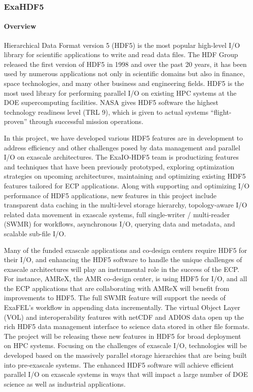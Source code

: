 \subsubsection{ ExaHDF5}
\label{subsubsect:exahdf5}

\paragraph{Overview} 

Hierarchical Data Format version 5 (HDF5) is the most popular high-level I/O library for scientific applications to write and read data files. The HDF Group released the first version of HDF5 in 1998 and over the past 20 years, it has been used by numerous applications not only in scientific domains but also in finance, space technologies, and many other business and engineering fields. HDF5 is the most used library for performing parallel I/O on existing HPC systems at the DOE supercomputing facilities. NASA gives HDF5 software the highest technology readiness level (TRL 9), which is given to actual systems ``flight-proven'' through successful mission operations. 

In this project, we have developed various HDF5 features are in development to address efficiency and other challenges posed by data management and parallel I/O on exascale architectures. The ExaIO-HDF5 team is productizing features and techniques that have been previously prototyped, exploring optimization strategies on upcoming architectures, maintaining and optimizing existing HDF5 features tailored for ECP applications. Along with supporting and optimizing I/O performance of HDF5 applications, new features in this project include transparent data caching in the multi-level storage hierarchy, topology-aware I/O related data movement in exascale systems, full single-writer / multi-reader (SWMR) for workflows, asynchronous I/O, querying data and metadata, and scalable sub-file I/O. 

Many of the funded exascale applications and co-design centers require HDF5 for their I/O, and enhancing the HDF5 software to handle the unique challenges of exascale architectures will play an instrumental role in the success of the ECP. For instance, AMReX, the AMR co-design center, is using HDF5 for I/O, and all the ECP applications that are collaborating with AMReX will benefit from improvements to HDF5. The full SWMR feature will support the needs of ExaFEL’s workflow in appending data incrementally. The virtual Object Layer (VOL) and interoperability features with netCDF and ADIOS data open up the rich HDF5 data management interface to science data stored in other file formats. The project will be releasing these new features in HDF5 for broad deployment on HPC systems. Focusing on the challenges of exascale I/O, technologies will be developed based on the massively parallel storage hierarchies that are being built into pre-exascale systems. The enhanced HDF5 software will achieve efficient parallel I/O on exascale systems in ways that will impact a large number of DOE science as well as industrial applications.

